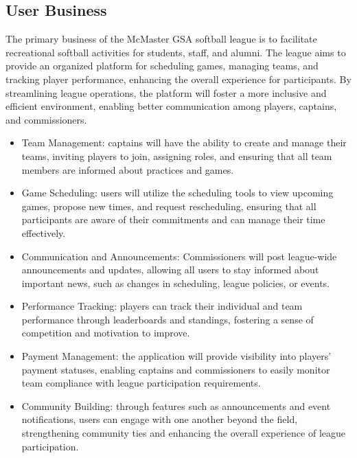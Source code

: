 \documentclass[12pt, titlepage]{article}
\begin{document}
\subsection{User Business}
The primary business of the McMaster GSA softball league is to facilitate recreational softball activities for students, staff, and alumni. The league aims to provide an organized platform for scheduling games, managing teams, and tracking player performance, enhancing the overall experience for participants. By streamlining league operations, the platform will foster a more inclusive and efficient environment, enabling better communication among players, captains, and commissioners.\
\begin{itemize}
  \item Team Management: captains will have the ability to create and manage their teams, inviting players to join, assigning roles, and ensuring that all team members are informed about practices and games.
  \item Game Scheduling: users will utilize the scheduling tools to view upcoming games, propose new times, and request rescheduling, ensuring that all participants are aware of their commitments and can manage their time effectively.
  \item Communication and Announcements: Commissioners will post league-wide announcements and updates, allowing all users to stay informed about important news, such as changes in scheduling, league policies, or events.
  \item Performance Tracking: players can track their individual and team performance through leaderboards and standings, fostering a sense of competition and motivation to improve.
  \item Payment Management: the application will provide visibility into players' payment statuses, enabling captains and commissioners to easily monitor team compliance with league participation requirements.
  \item Community Building: through features such as announcements and event notifications, users can engage with one another beyond the field, strengthening community ties and enhancing the overall experience of league participation.
\end{itemize}
\end{document}
